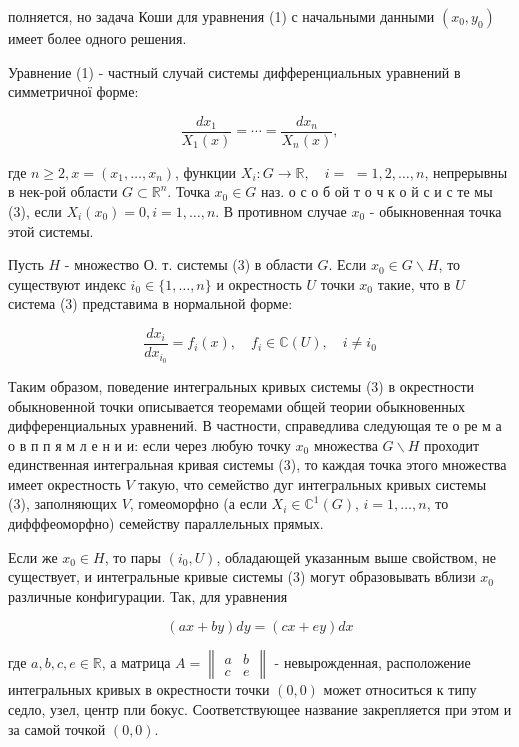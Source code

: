 \documentclass[10pt]{article}
\begin{document}
полняется, но задача Коши для уравнения (1) с начальными данными $\left(x_{0}, y_{0}\right)$ имеет более одного решения.

Уравнение (1) - частный случай системы дифференциальных уравнений в симметричної форме:

\[
\frac{d x_{1}}{X_{1}(x)}=\cdots=\frac{d x_{n}}{X_{n}(x)},
\]

где $n \geqslant 2, x=\left(x_{1}, \ldots, x_{n}\right)$, функции $X_{i}: G \rightarrow \mathbb{R}, \quad i=$ $=1,2, \ldots, n$, непрерывны в нек-рой области $G \subset \mathbb{R}^{n}$. Точка $x_{0} \in G$ наз. о с о б ой т о ч к о й с и с те мы (3), если $X_{i}\left(x_{0}\right)=0, i=1, \ldots, n$. В противном случае $x_{0}$ - обыкновенная точка этой системы.

Пусть $H$ - множество О. т. системы (3) в области $G$. Если $x_{0} \in G \backslash H$, то существуют индекс $i_{0} \in\{1, \ldots, n\}$ и окрестность $U$ точки $x_{0}$ такие, что в $U$ система (3) представима в нормальной форме:

\[
\frac{d x_{i}}{d x_{i_{0}}}=f_{i}(x), \quad f_{i} \in \mathbb{C}(U), \quad i \neq i_{0}
\]

Таким образом, поведение интегральных кривых системы (3) в окрестности обыкновенной точки описывается теоремами общей теории обыкновенных дифференциальных уравнений. В частности, справедлива следующая те о ре м а о в п п я м л е н и и: если через любую точку $x_{0}$ множества $G \backslash H$ проходит единственная интегральная кривая системы (3), то каждая точка этого множества имеет окрестность $V$ такую, что семейство дуг интегральных кривых системы (3), заполняющих $V$, гомеоморфно (а если $X_{i} \in \mathbb{C}^{1}(G)$, $i=1, \ldots, n$, то дифффеоморфно) семейству параллельных прямых.

Если же $x_{0} \in H$, то пары $\left(i_{0}, U\right)$, обладающей указанным выше свойством, не существует, и интегральные кривые системы (3) могут образовывать вблизи $x_{0}$ различные конфигурации. Так, для уравнения

\[
(a x+b y) d y=(c x+e y) d x
\]

где $a, b, c, e \in \mathbb{R}$, а матрица $A=\left\|\begin{array}{ll}a & b \\ c & e\end{array}\right\|$ - невырожденная, расположение интегральных кривых в окрестности точки $(0,0)$ может относиться к типу седло, узел, центр пли бокус. Соответствующее название закрепляется при этом и за самой точкой $(0,0)$.
\end{document}
